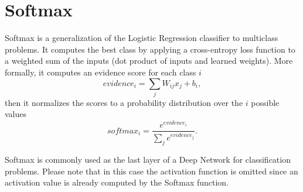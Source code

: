 \section{Softmax}
\label{sec:softmax}

Softmax is a generalization of the Logistic Regression classifier to multiclass problems.
It computes the best class by applying a cross-entropy loss function to a weighted sum of the inputs (dot product of inputs and learned weights).
More formally, it computes an evidence score for each class $i$
\begin{equation*}
    evidence_i = \sum_{j}{W_{ij} x_j + b_i},
\end{equation*}
then it normalizes the scores to a probability distribution over the $i$ possible values
\begin{equation*}
    softmax_i = \frac{e^{evidence_i}}{\sum_{j}{e^{evidence_j}}}.
\end{equation*}

Softmax is commonly used as the last layer of a Deep Network for classification problems.
Please note that in this case the activation function is omitted since an activation value is already computed by the Softmax function.
